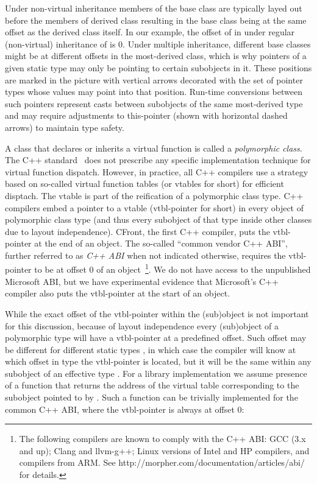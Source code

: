 Under non-virtual inheritance members of the base class are typically layed out 
before the members of derived class resulting in the base class being at the 
same offset as the derived class itself. In our example, the offset of  
in  under regular (non-virtual) inheritance of  is 0.
Under multiple inheritance, different base classes might be at different offsets 
in the most-derived class, which is why pointers of a given static type may only 
be pointing to certain subobjects in it. These positions are marked in the 
picture with vertical arrows decorated with the set of pointer types whose 
values may point into that position. Run-time conversions between such pointers 
represent casts between subobjects of the same most-derived type and may require 
adjustments to this-pointer (shown with horizontal dashed arrows) to maintain 
type safety.

A class that declares or inherits a virtual function is called a 
\emph{polymorphic class}. The C++ standard~\cite{C++11} does not prescribe any 
specific implementation technique for virtual function dispatch.
However, in practice, all C++ compilers use a strategy based on so-called
virtual function tables (or vtables for short) for efficient disptach. 
The vtable is part of the reification of a polymorphic class type.  
C++ compilers embed a pointer to a vtable (vtbl-pointer for short) in every object of
polymorphic class type (and thus every subobject of that type inside other 
classes due to layout independence). CFront, the first C++ compiler, puts the 
vtbl-pointer 
at the end of an object. The so-called ``common vendor C++ ABI''\cite{C++ABI}, 
further referred to as \emph{C++ ABI} when not indicated otherwise, requires the 
vtbl-pointer to be at offset 0 of an object~\footnote{The following compilers 
are known to comply with the C++ ABI: GCC (3.x and up); Clang and llvm-g++; 
Linux versions of Intel and HP compilers, and compilers from ARM. See 
http://morpher.com/documentation/articles/abi/ for details.}. We do not have 
access to the unpublished Microsoft ABI, but we have experimental evidence that 
Microsoft's C++ compiler also puts the vtbl-pointer at the start of an object.

While the exact offset of the vtbl-pointer within the (sub)object is not important 
for this discussion, because of layout independence every (sub)object of a 
polymorphic type  will have a vtbl-pointer at a predefined offset. 
Such offset may be different for different static types , in which case 
the compiler will know at which offset in type  the vtbl-pointer is 
located, but it will be the same within any subobject of an effective type 
. For a library implementation we assume presence of a function 
that returns the address of the virtual table corresponding to the subobject 
pointed to by . Such a function can be trivially implemented for the 
common C++ ABI, where the vtbl-pointer is always at offset 0:


